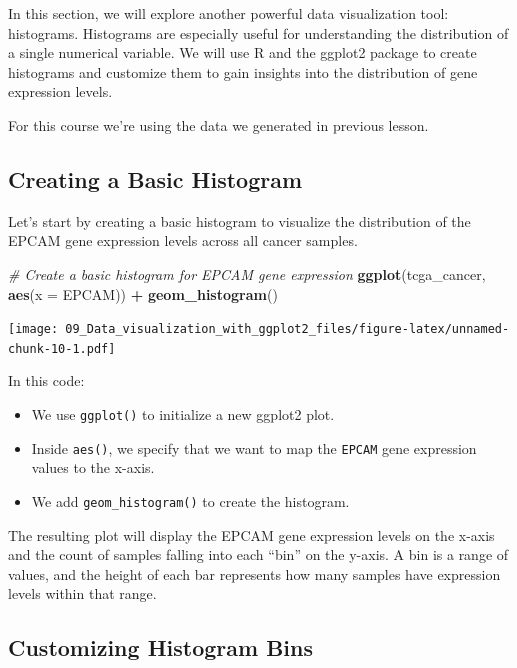 \documentclass[
]{book}
\newenvironment{Shaded}{\begin{snugshade}}{\end{snugshade}}
\newcommand{\AttributeTok}[1]{\textcolor[rgb]{0.13,0.29,0.53}{#1}}
\newcommand{\CommentTok}[1]{\textcolor[rgb]{0.56,0.35,0.01}{\textit{#1}}}
\newcommand{\FunctionTok}[1]{\textcolor[rgb]{0.13,0.29,0.53}{\textbf{#1}}}
\newcommand{\NormalTok}[1]{#1}
\newcommand{\SpecialCharTok}[1]{\textcolor[rgb]{0.81,0.36,0.00}{\textbf{#1}}}
\begin{document}
In this section, we will explore another powerful data visualization tool: histograms. Histograms are especially useful for understanding the distribution of a single numerical variable. We will use R and the ggplot2 package to create histograms and customize them to gain insights into the distribution of gene expression levels.

For this course we're using the data we generated in previous lesson.

\hypertarget{creating-a-basic-histogram}{%
\subsection{Creating a Basic Histogram}\label{creating-a-basic-histogram}}

Let's start by creating a basic histogram to visualize the distribution of the EPCAM gene expression levels across all cancer samples.

\begin{Shaded}
\begin{Highlighting}[]
\CommentTok{\# Create a basic histogram for EPCAM gene expression}
\FunctionTok{ggplot}\NormalTok{(tcga\_cancer, }\FunctionTok{aes}\NormalTok{(}\AttributeTok{x =}\NormalTok{ EPCAM)) }\SpecialCharTok{+}
  \FunctionTok{geom\_histogram}\NormalTok{()}
\end{Highlighting}
\end{Shaded}

\texttt{[image: 09\_Data\_visualization\_with\_ggplot2\_files/figure-latex/unnamed-chunk-10-1.pdf]}

In this code:

\begin{itemize}
\item
  We use \texttt{ggplot()} to initialize a new ggplot2 plot.
\item
  Inside \texttt{aes()}, we specify that we want to map the \texttt{EPCAM} gene expression values to the x-axis.
\item
  We add \texttt{geom\_histogram()} to create the histogram.
\end{itemize}

The resulting plot will display the EPCAM gene expression levels on the x-axis and the count of samples falling into each ``bin'' on the y-axis. A bin is a range of values, and the height of each bar represents how many samples have expression levels within that range.

\hypertarget{customizing-histogram-bins}{%
\subsection{Customizing Histogram Bins}\label{customizing-histogram-bins}}
\end{document}
